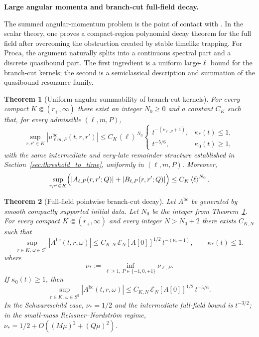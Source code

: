 \documentclass[12pt]{article}
\numberwithin{equation}{section}
\theoremstyle{plain}
\newtheorem{theorem}{Theorem}[section]
\theoremstyle{definition}
\theoremstyle{remark}
\newcommand{\bc}{\mathrm{bc}}
\newcommand{\kap}{\kappa}
\newcommand{\angles}[1]{\left\langle #1 \right\rangle}
\newcommand{\abs}[1]{\left|#1\right|}
\begin{document}
\medskip\noindent\textbf{Large angular momenta and branch-cut full-field decay.}\par\smallskip\noindent
The summed angular-momentum problem is the point of contact with \cite{ShlapentokhRothmanVanDeMoortel2026}.  In the scalar theory, one proves a compact-region polynomial decay theorem for the full field after overcoming the obstruction created by stable timelike trapping.  For Proca, the argument naturally splits into a continuous spectral part and a discrete quasibound part.  The first ingredient is a uniform large-$\ell$ bound for the branch-cut kernels; the second is a semiclassical description and summation of the quasibound resonance family.

\begin{theorem}[Uniform angular summability of branch-cut kernels]\label{thm:uniform_angular}
For every compact $K\Subset(r_+,\infty)$ there exist an integer $N_0\ge0$ and a constant $C_K$ such that, for every admissible $(\ell,m,P)$,
\begin{equation}\label{eq:uniform_angular_kernel_bound}
   \sup_{r,r'\in K}\abs{u_{\ell m,P}^{\bc}(t,r,r')}
   \le
   C_K\angles{\ell}^{N_0}
   \begin{cases}
      t^{-(\nu_{\ell,P}+1)}, & \kap_*(t)\le1,\\[0.5ex]
      t^{-5/6}, & \kap_0(t)\ge1,
   \end{cases}
\end{equation}
with the same intermediate and very-late remainder structure established in Section~\ref{sec:threshold_to_time}, uniformly in $(\ell,m,P)$.  Moreover,
\begin{equation}\label{eq:uniform_angular_amplitudes}
   \sup_{r,r'\in K}
   \Bigl(
      \abs{A_{\ell,P}(r,r';Q)}
      +
      \abs{B_{\ell,P}(r,r';Q)}
   \Bigr)
   \le C_K\angles{\ell}^{N_0}.
\end{equation}
\end{theorem}

\begin{theorem}[Full-field pointwise branch-cut decay]\label{thm:full_field_pointwise}
Let $A^{\bc}$ be generated by smooth compactly supported initial data.  Let $N_0$ be the integer from Theorem~\ref{thm:uniform_angular}.  For every compact $K\Subset(r_+,\infty)$ and every integer $N>N_0+2$ there exists $C_{K,N}$ such that
\begin{equation}\label{eq:full_field_intermediate}
   \sup_{r\in K,\,\omega\in S^2}\abs{A^{\bc}(t,r,\omega)}
   \le
   C_{K,N}\,\mathcal E_N[A[0]]^{1/2}\,t^{-(\nu_*+1)},
   \qquad
   \kap_*(t)\le1.
\end{equation}
where
\[
   \nu_*:=\inf_{\ell\ge1,\ P\in\{-1,0,+1\}}\nu_{\ell,P}.
\]
If $\kap_0(t)\ge1$, then
\begin{equation}\label{eq:full_field_late}
   \sup_{r\in K,\,\omega\in S^2}\abs{A^{\bc}(t,r,\omega)}
   \le
   C_{K,N}\,\mathcal E_N[A[0]]^{1/2}\,t^{-5/6}.
\end{equation}
In the Schwarzschild case, $\nu_*=1/2$ and the intermediate full-field bound is $t^{-3/2}$; in the small-mass Reissner--Nordstr\"om regime, $\nu_*=1/2+O((M\mu)^2+(Q\mu)^2)$.
\end{theorem}
\end{document}
